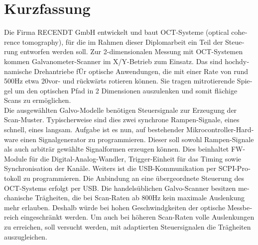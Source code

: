 \chapter{Kurzfassung}

\begin{german}
Die Firma RECENDT GmbH entwickelt und baut OCT-Systeme (optical coherence tomography), f{\"u}r die im Rahmen dieser Diplomarbeit ein Teil der Steuerung entworfen werden soll. Zur 2-dimensionalen Messung mit OCT-Systemen kommen Galvanometer-Scanner im X/Y-Betrieb zum Einsatz. Das sind hochdynamische Drehantriebe f{\"U}r optische Anwendungen, die mit einer Rate von rund 500Hz etwa 20\textdegree vor- und r{\"u}ckw{\"a}rts rotieren k{\"o}nnen. Sie tragen mitrotierende Spiegel um den optischen Pfad in 2 Dimensionen auszulenken und somit fl{\"a}chige Scans zu erm{\"o}glichen. \\

Die ausgew{\"a}hlten Galvo-Modelle ben{\"o}tigen Steuersignale zur Erzeugung der Scan-Muster. Typischerweise sind dies zwei synchrone Rampen-Signale, eines schnell, eines langsam. Aufgabe ist es nun, auf bestehender Mikrocontroller-Hardware einen Signalgenerator zu programmieren. Dieser soll sowohl Rampen-Signale als auch arbitr{\"a}r gew{\"a}hlte Signalformen erzeugen k{\"o}nnen. Dies beinhaltet FW-Module f{\"u}r die Digital-Analog-Wandler, Trigger-Einheit f{\"u}r das Timing sowie Synchronisation der Kan{\"a}le. Weiters ist die USB-Kommunikation per SCPI-Protokoll zu programmieren. Die Anbindung an eine {\"u}bergeordnete Steuerung des OCT-Systems erfolgt per USB. Die handels{\"u}blichen Galvo-Scanner besitzen mechanische Tr{\"a}gheiten, die bei Scan-Raten ab 800Hz kein maximale Auslenkung mehr erlauben. Deshalb w{\"u}rde bei hohen Geschwindgkeiten der optische Messbereich eingeschr{\"a}nkt werden. Um auch bei h{\"o}heren Scan-Raten volle Auslenkungen zu erreichen, soll versucht werden, mit adaptierten Steuersignalen die Tr{\"a}gheiten auszugleichen. \\
\end{german}